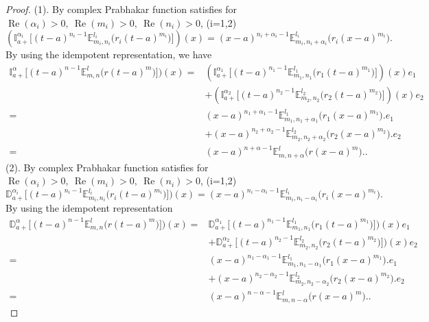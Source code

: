 \documentclass[a4paper,12pt]{article}
\theoremstyle{remark}
\begin{document}
\begin{proof}
	(1). By \cite[Theorem 3, equation (3.1)]{kilbas2004generalized} complex Prabhakar function satisfies for  \(\operatorname{Re}(\alpha_i) > 0,~\operatorname{Re}(m_i) > 0, ~\operatorname{Re}(n_i) > 0\), (i=1,2)
    \begin{equation}
	(\mathbb{I}_{a+}^{\alpha_i} \big[(t - a)^{n_i - 1} \mathbb{E}_{m_i, n_i}^{l_i}\big(r_i (t - a)^{m_i}\big)\big])(x)
			=(x - a)^{n_i + \alpha_i - 1} \mathbb{E}_{m_i, n_i + \alpha_i}^{l_i}\big(r_i (x - a)^{m_i})\big.
				\end{equation}
    By using the idempotent representation, 
    we have
	\begin{equation}
	\begin{split}
		\mathbb{I}_{a+}^{\alpha} \big[(t - a)^{n - 1} \mathbb{E}_{m, n}^{l}\big(r (t - a)^{m}\big)\big])(x)
		=&	(\mathbb{I}_{a+}^{\alpha_1} \big[(t - a)^{n_1 - 1} \mathbb{E}_{m_1, n_1}^{l_1}\big(r_1 (t - a)^{m_1}\big)\big])(x)e_1\\
		&+	(\mathbb{I}_{a+}^{\alpha_2} \big[(t - a)^{n_2 - 1} \mathbb{E}_{m_2, n_2}^{l_2}\big(r_2 (t - a)^{m_2}\big)\big])(x)e_2\\
			=&(x - a)^{n_1 + \alpha_1 - 1} \mathbb{E}_{m_1, n_1 + \alpha_1}^{l_1}\big(r_1 (x - a)^{m_1})\big.e_1\\
			&+(x - a)^{n_2 + \alpha_2 - 1} \mathbb{E}_{m_2, n_2 + \alpha_2}^{l_2}\big(r_2 (x - a)^{m_2})\big.e_2\\
=&	(x - a)^{n + \alpha - 1} \mathbb{E}_{m, n + \alpha}^{l}\big(r (x - a)^{m})\big..
	\end{split}
	\end{equation}
	(2). By \cite[Theorem 3, equation (3.2)]{kilbas2004generalized} complex Prabhakar function satisfies for  \(\operatorname{Re}(\alpha_i) > 0,~\operatorname{Re}(m_i) > 0, ~\operatorname{Re}(n_i) > 0\), (i=1,2) 
    \begin{equation}
        \mathbb{D}_{a+}^{\alpha_i} \big[(t - a)^{n_i - 1} \mathbb{E}_{m_i, n_i}^{l_i}\big(r_i (t - a)^{m_i}\big)\big])(x)=(x - a)^{n_i - \alpha_i - 1} \mathbb{E}_{m_i, n_i - \alpha_i}^{l_i}\big(r_i (x - a)^{m_i})\big.
    \end{equation}
By using the idempotent representation  
       \begin{equation}
	\begin{split}
		\mathbb{D}_{a+}^{\alpha} \big[(t - a)^{n - 1} \mathbb{E}_{m, n}^{l}\big(r (t - a)^{m}\big)\big])(x)=& \mathbb{D}_{a+}^{\alpha_1} \big[(t - a)^{n_1 - 1} \mathbb{E}_{m_1, n_1}^{l_1}\big(r_1 (t - a)^{m_1}\big)\big])(x)e_1\\
		&+\mathbb{D}_{a+}^{\alpha_2} \big[(t - a)^{n_2 - 1} \mathbb{E}_{m_2, n_2}^{l_2}\big(r_2 (t - a)^{m_2}\big)\big])(x)e_2\\
	=&(x - a)^{n_1 - \alpha_1 - 1} \mathbb{E}_{m_1, n_1 - \alpha_1}^{l_1}\big(r_1 (x - a)^{m_1})\big.e_1\\
	&+(x - a)^{n_2 - \alpha_2 - 1} \mathbb{E}_{m_2, n_2 - \alpha_2}^{l_2}\big(r_2 (x - a)^{m_2})\big.e_2\\
	=&(x - a)^{n - \alpha - 1} \mathbb{E}_{m, n - \alpha}^{l}\big(r (x - a)^{m})\big..
	\end{split}
	\end{equation}
\end{proof}
\end{document}

